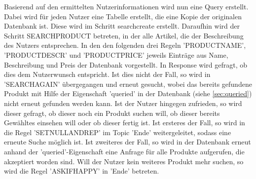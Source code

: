 Basierend auf den ermittelten Nutzerinformationen wird nun eine Query erstellt. Dabei wird für jeden Nutzer eine Tabelle erstellt, die eine Kopie der originalen Datenbank ist. Diese wird im Schritt searchcreate erstellt. Daraufhin wird der Schritt SEARCHPRODUCT betreten, in der alle Artikel, die der Beschreibung des Nutzers entsprechen. In den den folgenden drei Regeln 'PRODUCTNAME', 'PRODUCTDESCR' und 'PRODUCTPRICE' jeweils Einträge aus Name, Beschreibung und Preis der Datenbank vorgestellt. In Response wird gefragt, ob dies dem Nutzerwunsch entspricht. Ist dies nicht der Fall, so wird in 'SEARCHAGAIN' übergegangen und erneut gesucht, wobei das bereits gefundene Produkt mit Hilfe der Eigenschaft 'queried' in der Datenbank (siehe \ref{sec:queried}) nicht erneut gefunden werden kann. Ist der Nutzer hingegen zufrieden, so wird dieser gefragt, ob dieser noch ein Produkt suchen will, ob dieser bereits Gewähltes einsehen will oder ob dieser fertig ist. Ist ersteres der Fall, so wird in die Regel 'SETNULLANDREP' im Topic 'Ende' weitergeleitet, sodass eine erneute Suche möglich ist. Ist zweiteres der Fall, so wird in der Datenbank erneut anhand der 'queried'-Eigenschaft eine Anfrage für alle Produkte aufgerufen, die akzeptiert worden sind. Will der Nutzer kein weiteres Produkt mehr suchen, so wird die Regel 'ASKIFHAPPY' in 'Ende' betreten.  

